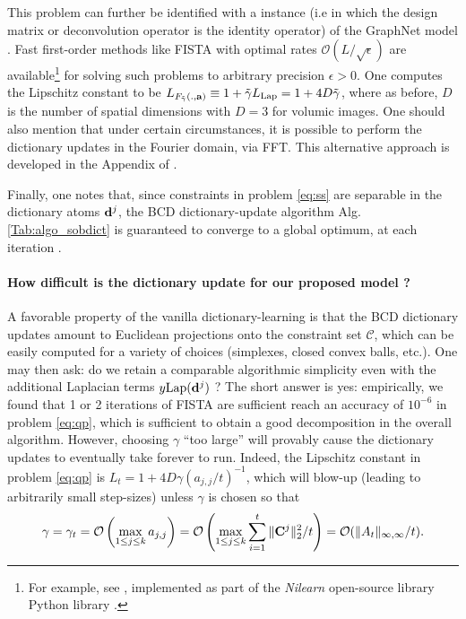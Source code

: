 This problem can further be identified with a  instance
(i.e in which the design matrix or deconvolution operator is the
identity operator) of the GraphNet model
  \citep{grosenick2013,hebiri2011}.
%
Fast first-order methods like FISTA  \citep{beck09fista} with optimal rates $\mathcal{O}(L/\sqrt{\epsilon})$ are available\footnote{For example, see   \citep{dohmatob2014benchmarking,varoquaux2015faasta}, implemented as part of the \textit{Nilearn} open-source library Python library   \citep{nilearn}.} for solving such problems to arbitrary precision $\epsilon > 0$.
One computes the Lipschitz constant to be
$L_{F_{\tilde{\gamma}}(.,\mathbf{a})} \equiv 1 + \tilde{\gamma} L_{{\text{Lap}}} = 1 + 4D\tilde{\gamma}$, where as before, $D$ is the number of spatial dimensions with $D=3$ for volumic images. One should also mention that under certain circumstances, it is possible to perform the dictionary updates in the Fourier domain, via FFT. This alternative approach is developed in the Appendix of   \citep{dohmatob2016}.

Finally, one notes that, since constraints in problem \eqref{eq:ss} are separable in the dictionary atoms $\mathbf{d}^j$, the BCD dictionary-update algorithm Alg. \ref{Tab:algo_sobdict} is guaranteed to converge to a global optimum, at each iteration   \citep{bertsekas1999nonlinear, mairal2010}.


\paragraph*{How difficult is the dictionary update for our proposed model ?}
A favorable property of the vanilla dictionary-learning   \citep{mairal2010} is that the BCD dictionary updates amount to Euclidean projections onto the constraint set $\mathcal C$, which can be easily computed for a variety of choices (simplexes, closed convex balls, etc.). One may then ask: do we retain a comparable algorithmic simplicity even with the additional Laplacian terms $y{\text{Lap}}(\mathbf{d}^j)$ ? The short answer is yes:
empirically, we found that 1 or 2 iterations of FISTA  \citep{beck09fista}
are sufficient reach an accuracy of $10^{-6}$ in problem \eqref{eq:qp}, which is sufficient to obtain a good decomposition in the overall algorithm.
However, choosing $\gamma$ ``too large'' will provably cause the dictionary updates to eventually take forever to run. Indeed, the Lipschitz constant in problem \eqref{eq:qp} is $L_t = 1 + 4D \gamma (a_{j,j}/t)^{-1}$, which will blow-up (leading to arbitrarily small step-sizes) unless $\gamma$ is chosen so that
\begin{equation}
\gamma = \gamma_t = \mathcal O\left(\max_{1 \le j \le k}a_{j,j}\right) = \mathcal O\left(\max_{1 \le j \le k}\sum_{i=1}^t\|\mathbf{C}^j\|_2^2/t\right) = \mathcal O(\|A_t\|_{\infty,\infty}/t).
\label{eq:blowup}
\end{equation}

